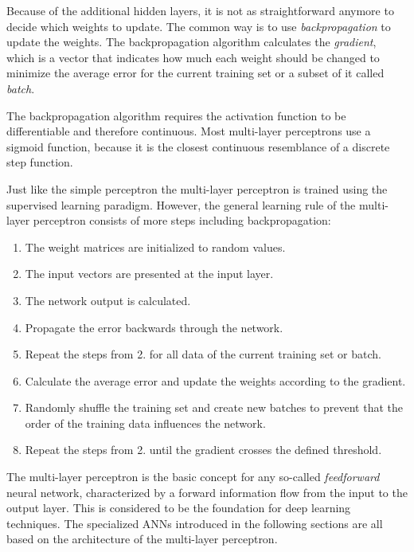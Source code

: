 Because of the additional hidden layers, it is not as straightforward anymore to decide which weights to update. The common way is to use \textit{backpropagation} to update the weights. The backpropagation algorithm calculates the \textit{gradient}, which is a vector that indicates how much each weight should be changed to minimize the average error for the current training set or a subset of it called \textit{batch}.
\cite{nielsen2015neural,hochreiter2001gradient}

The backpropagation algorithm requires the activation function to be differentiable and therefore continuous. Most multi-layer perceptrons use a sigmoid function, because it is the closest continuous resemblance of a discrete step function.
\cite{haykin2009neural,nielsen2015neural}

Just like the simple perceptron the multi-layer perceptron is trained using the supervised learning paradigm. However, the general learning rule of the multi-layer perceptron consists of more steps including backpropagation:

\begin{enumerate}
    \item The weight matrices are initialized to random values.
    \item The input vectors are presented at the input layer.
    \item The network output is calculated.
    \item Propagate the error backwards through the network.
    \item Repeat the steps from 2. for all data of the current training set or batch.
    \item Calculate the average error and update the weights according to the gradient.
    \item Randomly shuffle the training set and create new batches to prevent that the order of the training data influences the network.
    \item Repeat the steps from 2. until the gradient crosses the defined threshold.
    \cite{nielsen2015neural}
    
\end{enumerate}

The multi-layer perceptron is the basic concept for any so-called \textit{feedforward} neural network, characterized by a forward information flow from the input to the output layer. This is considered to be the foundation for deep learning techniques. The specialized \acp{ANN} introduced in the following sections are all based on the architecture of the multi-layer perceptron.
\cite{nielsen2015neural}

